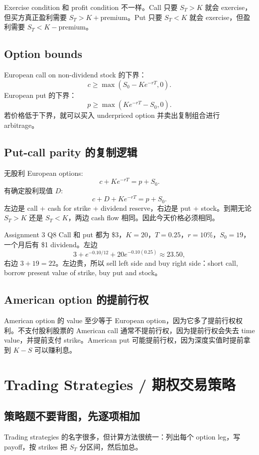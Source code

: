 Exercise condition 和 profit condition 不一样。Call 只要 $S_T>K$ 就会 exercise，但买方真正盈利需要 $S_T>K+\text{premium}$。Put 只要 $S_T<K$ 就会 exercise，但盈利需要 $S_T<K-\text{premium}$。

\subsection{Option bounds}
European call on non-dividend stock 的下界：
\[
c\geq \max(S_0-Ke^{-rT},0).
\]
European put 的下界：
\[
p\geq \max(Ke^{-rT}-S_0,0).
\]
若价格低于下界，就可以买入 underpriced option 并卖出复制组合进行 arbitrage。

\subsection{Put-call parity 的复制逻辑}
无股利 European options:
\[
c+Ke^{-rT}=p+S_0.
\]
有确定股利现值 $D$:
\[
c+D+Ke^{-rT}=p+S_0.
\]
左边是 call + cash for strike + dividend reserve，右边是 put + stock。到期无论 $S_T>K$ 还是 $S_T<K$，两边 cash flow 相同。因此今天价格必须相同。

\begin{examplebox}{Assignment 3 Q8}
Call 和 put 都为 \$3，$K=20$，$T=0.25$，$r=10\%$，$S_0=19$，一个月后有 \$1 dividend。左边
\[
3+e^{-0.10/12}+20e^{-0.10(0.25)}\approx23.50,
\]
右边 $3+19=22$。左边贵，所以 sell left side and buy right side：short call, borrow present value of strike, buy put and stock。
\end{examplebox}

\subsection{American option 的提前行权}
American option 的 value 至少等于 European option，因为它多了提前行权权利。不支付股利股票的 American call 通常不提前行权，因为提前行权会失去 time value，并提前支付 strike。American put 可能提前行权，因为深度实值时提前拿到 $K-S$ 可以赚利息。

\section{Trading Strategies / 期权交易策略}

\subsection{策略题不要背图，先逐项相加}
Trading strategies 的名字很多，但计算方法很统一：列出每个 option leg，写 payoff，按 strikes 把 $S_T$ 分区间，然后加总。

